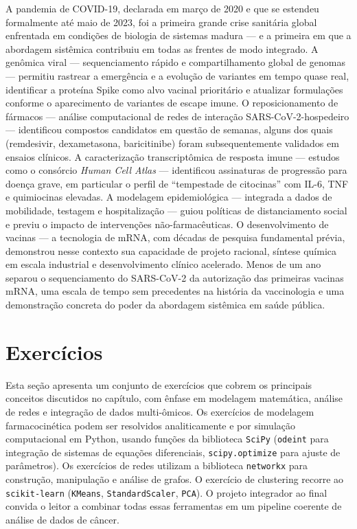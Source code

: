 A pandemia de COVID-19, declarada em março de 2020 e que se estendeu formalmente até maio de 2023, foi a primeira grande crise sanitária global enfrentada em condições de biologia de sistemas madura --- e a primeira em que a abordagem sistêmica contribuiu em todas as frentes de modo integrado. A genômica viral --- sequenciamento rápido e compartilhamento global de genomas --- permitiu rastrear a emergência e a evolução de variantes em tempo quase real, identificar a proteína Spike como alvo vacinal prioritário e atualizar formulações conforme o aparecimento de variantes de escape imune. O reposicionamento de fármacos --- análise computacional de redes de interação SARS-CoV-2-hospedeiro --- identificou compostos candidatos em questão de semanas, alguns dos quais (remdesivir, dexametasona, baricitinibe) foram subsequentemente validados em ensaios clínicos. A caracterização transcriptômica de resposta imune --- estudos como o consórcio \emph{Human Cell Atlas} --- identificou assinaturas de progressão para doença grave, em particular o perfil de ``tempestade de citocinas'' com IL-6, TNF e quimiocinas elevadas. A modelagem epidemiológica --- integrada a dados de mobilidade, testagem e hospitalização --- guiou políticas de distanciamento social e previu o impacto de intervenções não-farmacêuticas. O desenvolvimento de vacinas --- a tecnologia de mRNA, com décadas de pesquisa fundamental prévia, demonstrou nesse contexto sua capacidade de projeto racional, síntese química em escala industrial e desenvolvimento clínico acelerado. Menos de um ano separou o sequenciamento do SARS-CoV-2 da autorização das primeiras vacinas mRNA, uma escala de tempo sem precedentes na história da vaccinologia e uma demonstração concreta do poder da abordagem sistêmica em saúde pública.


\section{Exercícios}
\label{sec:13-exercicios}

Esta seção apresenta um conjunto de exercícios que cobrem os principais conceitos discutidos no capítulo, com ênfase em modelagem matemática, análise de redes e integração de dados multi-ômicos. Os exercícios de modelagem farmacocinética podem ser resolvidos analiticamente e por simulação computacional em Python, usando funções da biblioteca \texttt{SciPy} (\texttt{odeint} para integração de sistemas de equações diferenciais, \texttt{scipy.optimize} para ajuste de parâmetros). Os exercícios de redes utilizam a biblioteca \texttt{networkx} para construção, manipulação e análise de grafos. O exercício de clustering recorre ao \texttt{scikit-learn} (\texttt{KMeans}, \texttt{StandardScaler}, \texttt{PCA}). O projeto integrador ao final convida o leitor a combinar todas essas ferramentas em um pipeline coerente de análise de dados de câncer.


